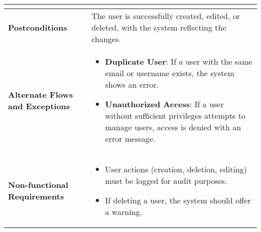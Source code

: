 \documentclass{article}
\begin{document}
\begin{longtable}{|p{4cm}|p{10cm}|}
\begin{enumerate}
\begin{itemize}
        \end{itemize}
    \end{enumerate} \\
    \hline
    \textbf{Postconditions} & The user is successfully created, edited, or deleted, with the system reflecting the changes. \\
    \hline
    \textbf{Alternate Flows and Exceptions} & \begin{itemize}
        \item \textbf{Duplicate User}: If a user with the same email or username exists, the system shows an error.
        \item \textbf{Unauthorized Access}: If a user without sufficient privileges attempts to manage users, access is denied with an error message.
    \end{itemize} \\
    \hline
    \textbf{Non-functional Requirements} & \begin{itemize}
        \item User actions (creation, deletion, editing) must be logged for audit purposes.
        \item If deleting a user, the system should offer a warning.
    \end{itemize} \\
    \hline
\end{longtable}

\end{document}
